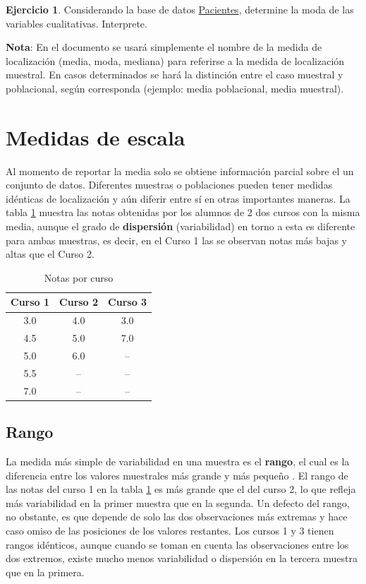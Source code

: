 \documentclass[
  11pt,
]{book}
\theoremstyle{definition}
\theoremstyle{definition}
\theoremstyle{definition}
\newtheorem{exercise}{Ejercicio}[chapter]
\theoremstyle{definition}
\theoremstyle{remark}
\begin{document}
\begin{exercise}
Considerando la base de datos \hyperref[Pacientes]{Pacientes}, determine la moda de las variables cualitativas. Interprete.
\end{exercise}

\textbf{Nota}: En el documento se usará simplemente el nombre de la medida de localización (media, moda, mediana) para referirse a la medida de localización muestral. En casos determinados se hará la distinción entre el caso muestral y poblacional, según corresponda (ejemplo: media poblacional, media muestral).

\section{Medidas de escala}\label{medidas-de-escala}

Al momento de reportar la media solo se obtiene información parcial sobre el un conjunto de datos. Diferentes muestras o poblaciones pueden tener medidas idénticas de localización y aún diferir entre sí en otras importantes maneras. La tabla \ref{tab:variabilidad} muestra las notas obtenidas por los alumnos de 2 dos cursos con la misma media, aunque el grado de \textbf{dispersión} (variabilidad) en torno a esta es diferente para ambas muestras, es decir, en el Curso 1 las se observan notas más bajas y altas que el Curso 2.

\begin{table}[H]
\centering
\caption{\label{tab:variabilidad}Notas por curso}
\centering
\begin{tabular}[t]{ccc}
\toprule
Curso 1 & Curso 2 & Curso 3\\
\midrule
3.0 & 4.0 & 3.0\\
4.5 & 5.0 & 7.0\\
5.0 & 6.0 & --\\
5.5 & -- & --\\
7.0 & -- & --\\
\bottomrule
\end{tabular}
\end{table}

\subsection{Rango}\label{rango}

La medida más simple de variabilidad en una muestra es el \textbf{rango}, el cual es la diferencia entre los valores muestrales más grande y más pequeño \citep[página 32]{Devore}. El rango de las notas del curso 1 en la tabla \ref{tab:variabilidad} es más grande que el del curso 2, lo que refleja más variabilidad en la primer muestra que en la segunda. Un defecto del rango, no obstante, es que depende de solo las dos observaciones más extremas y hace caso omiso de las posiciones de los valores restantes. Los cursos 1 y 3 tienen rangos idénticos, aunque cuando se toman en cuenta las observaciones entre los dos extremos, existe mucho menos variabilidad o dispersión en la tercera muestra que en la primera.
\end{document}

